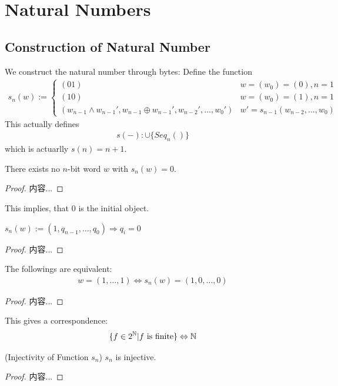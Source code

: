 \documentclass[Total.tex]{subfiles}
\begin{document}
		\section{Natural Numbers}
			\subsection{Construction of Natural Number}
				We construct the natural number through bytes: Define the function
				\begin{gather*}
					s_n(w):=\begin{cases}
						(01)&w=(w_0)=(0),n=1\\
						(10)&w=(w_0)=(1),n=1\\
						(w_{n-1}\wedge w_{n-1}',w_{n-1}\oplus w_{n-1}',w_{n-2}',\dots,w_0')&w'=s_{n-1}(w_{n-2},\dots,w_0)
					\end{cases}
				\end{gather*}
				This actually defines
				\begin{gather*}
					s(-):\cup \{Seq_n()\}
				\end{gather*}
				which is actuarlly $s(n)=n+1$.
				\begin{proposition}
					There exists no $n$-bit word $w$ with $s_n(w)=0$.
				\end{proposition}
				\begin{proof}
					内容...
				\end{proof}
				This implies, that $0$ is the initial object.
				
				\begin{proposition}
					$s_n(w):=(1,q_{n-1},\dots,q_0)\Rightarrow q_i=0$
				\end{proposition}
				\begin{proof}
					内容...
				\end{proof}
				\begin{proposition}
					The followings are equivalent:
					\begin{gather*}
						w=(1,\dots,1)\Leftrightarrow s_n(w)=(1,0,\dots,0)
					\end{gather*}
				\end{proposition}
				\begin{proof}
					内容...
				\end{proof}
				This gives a correspondence:
				\begin{gather*}
					\{f\in 2^{\mathbb{N}}|f\mbox{ is finite}\}\Leftrightarrow \mathbb{N}
				\end{gather*}
				\begin{proposition}
					(Injectivity of Function $s_n$) $s_n$ is injective. 
				\end{proposition}
				\begin{proof}
					内容...
				\end{proof}
\end{document}
